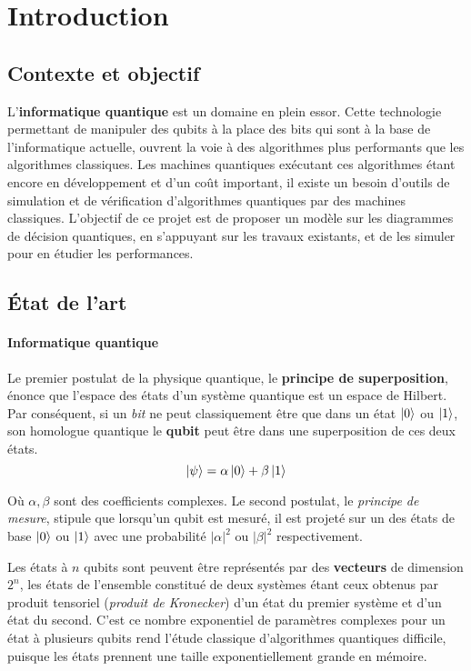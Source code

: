 \chapter{Introduction} %
\label{ch:Introduction}


\section{Contexte et objectif}
\label{sec:Contexte}

L'\textbf{informatique quantique} est un domaine en plein essor. Cette technologie permettant de manipuler des qubits à la place des bits qui sont à la base de l'informatique actuelle, ouvrent la voie à des algorithmes plus performants que les algorithmes classiques. Les machines quantiques exécutant ces algorithmes étant encore en développement et d'un coût important, il existe un besoin d'outils de simulation et de vérification d'algorithmes quantiques par des machines classiques. L'objectif de ce projet est de proposer un modèle sur les diagrammes de décision quantiques, en s'appuyant sur les travaux existants, et de les simuler pour en étudier les performances.

\section{État de l’art}
\label{sec:Etat}

\subsubsection*{Informatique quantique}

Le premier postulat de la physique quantique, le \textbf{principe de superposition}, énonce que l'espace des états d'un système quantique est un espace de Hilbert. Par conséquent, si un \textit{bit} ne peut classiquement être que dans un état $\ket 0$ ou $\ket 1$, son homologue quantique le \textbf{qubit} peut être dans une superposition de ces deux états.
$$\ket \psi = \alpha \ket 0 + \beta \ket 1$$

Où $\alpha, \beta$ sont des coefficients complexes. Le second postulat, le \textit{principe de mesure}, stipule que lorsqu'un qubit est mesuré, il est projeté sur un des états de base $\ket 0$ ou $\ket 1$ avec une probabilité $|\alpha|^2$ ou $|\beta|^2$ respectivement.

Les états à $n$ qubits sont peuvent être représentés par des \textbf{vecteurs} de dimension $2^n$, les états de l'ensemble constitué de deux systèmes étant ceux obtenus par produit tensoriel (\textit{produit de Kronecker}) d'un état du premier système et d'un état du second. C'est ce nombre exponentiel de paramètres complexes pour un état à plusieurs qubits rend l'étude classique d'algorithmes quantiques difficile, puisque les états prennent une taille exponentiellement grande en mémoire.

